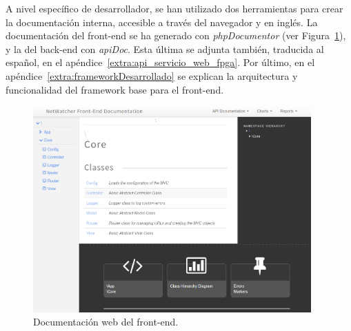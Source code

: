 A nivel específico de desarrollador, se han utilizado dos herramientas para crear la documentación interna, accesible a través del navegador y en inglés.
La documentación del \gls{front-end} se ha generado con \textit{phpDocumentor} (ver Figura~\ref{fig:captura:docsfrontend}), y la del \gls{back-end} con \textit{apiDoc}.
Esta última se adjunta también, traducida al español, en el apéndice~\ref{extra:api_servicio_web_fpga}.
Por último, en el apéndice~\ref{extra:frameworkDesarrollado} se explican la arquitectura y funcionalidad del \gls{framework} base para el \gls{front-end}.

\begin{figure}[!htp]
  \centering
  \includegraphics[width=0.95\textwidth,clip=true]{graphics/capturas/docs_frontend}
  \caption{Documentación web del \gls{front-end}.}
  \label{fig:captura:docsfrontend}
\end{figure}
